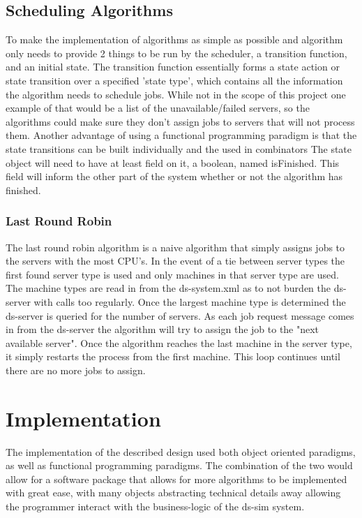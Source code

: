 \documentclass[a4paper]{article} %
\begin{document}
\subsection*{Scheduling Algorithms}
To make the implementation of algorithms as simple as possible and algorithm only needs to provide 2 things to be run by the scheduler, a transition function, and an initial state.
The transition function essentially forms a state action or state transition \cite{scala_fp} over a specified 'state type', which contains all the information the algorithm needs to schedule jobs.
While not in the scope of this project one example of that would be a list of the unavailable/failed servers, so the algorithms could make sure they don't assign jobs to servers that will not process them.
Another advantage of using a functional programming paradigm is that the state transitions can be built individually and the used in combinators \cite{scala_fp}
The state object will need to have at least field on it, a boolean, named isFinished. This field will inform the other part of the system whether or not the algorithm has finished.
\subsubsection*{Last Round Robin}
The last round robin algorithm is a naive algorithm that simply assigns jobs to the servers with the most CPU's.
In the event of a tie between server types the first found server type is used and only machines in that server type are used.
The machine types are read in from the ds-system.xml as to not burden the ds-server with calls too regularly.
Once the largest machine type is determined the ds-server is queried for the number of servers. 
As each job request message comes in from the ds-server the algorithm will try to assign the job to the "next available server".
Once the algorithm reaches the last machine in the server type, it simply restarts the process from the first machine.
This loop continues until there are no more jobs to assign.

\section*{Implementation}
The implementation of the described design used both object oriented paradigms, as well as functional programming paradigms.
The combination of the two would allow for a software package that allows for more algorithms to be implemented with great ease, with many objects abstracting technical details away allowing the programmer interact with the business-logic of the ds-sim system.
\end{document}
